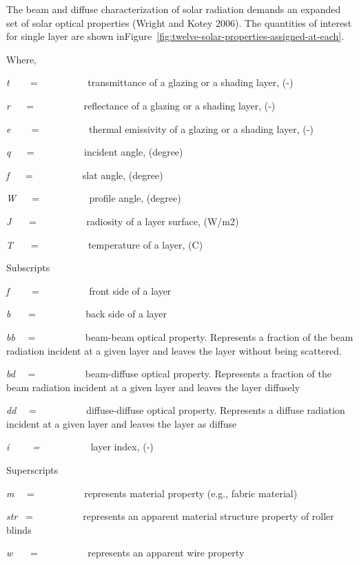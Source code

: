 The beam and diffuse characterization of solar radiation demands an expanded set of solar optical properties (Wright and Kotey 2006). The quantities of interest for single layer are shown inFigure~\ref{fig:twelve-solar-properties-assigned-at-each}.

Where,

\emph{t} ~~~ = ~~~~~~~~~ transmittance of a glazing or a shading layer, (-)

\emph{r} ~~ = ~~~~~~~~~ reflectance of a glazing or a shading layer, (-)

\emph{e} ~~~ = ~~~~~~~~~ thermal emissivity of a glazing or a shading layer, (-)

\emph{q} ~~ = ~~~~~~~~~ incident angle, (degree)

\emph{f} ~~ = ~~~~~~~~~ slat angle, (degree)

\emph{W} ~~ = ~~~~~~~~~ profile angle, (degree)

\emph{J}~~~ = ~~~~~~~~~ radiosity of a layer surface, (W/m2)

\emph{T}~~~ = ~~~~~~~~~ temperature of a layer, (C)

Subscripts

\emph{f}~~~~ = ~~~~~~~~~ front side of a layer

\emph{b}~~~ = ~~~~~~~~~ back side of a layer

\emph{bb}~~ = ~~~~~~~~~ beam-beam optical property. Represents a fraction of the beam radiation incident at a given layer and leaves the layer without being scattered.

\emph{bd}~~ = ~~~~~~~~~ beam-diffuse optical property. Represents a fraction of the beam radiation incident at a given layer and leaves the layer diffusely

\emph{dd}~~ = ~~~~~~~~~ diffuse-diffuse optical property. Represents a diffuse radiation incident at a given layer and leaves the layer as diffuse

\emph{i~~~~ = ~~~~~~~~~} layer index, (-)

Superscripts

\emph{m}~~ = ~~~~~~~~~ represents material property (e.g., fabric material)

\emph{str}~ = ~~~~~~~~~ represents an apparent material structure property of roller blinds

\emph{w}~~~ = ~~~~~~~~~ represents an apparent wire property

